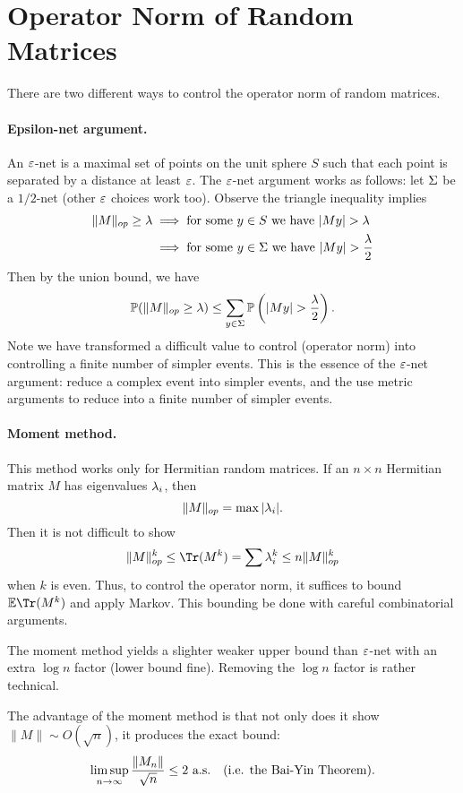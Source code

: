 \section*{Operator Norm of Random Matrices}

There are two different ways to control the operator norm of random matrices.

\paragraph{Epsilon-net argument.} An $\e$-net is a maximal set of points on the unit sphere $S$ such that each point is separated by a distance at least $\e$. The $\e$-net argument works as follows: let $\S$ be a $1/2$-net (other $\e$ choices work too). Observe the triangle inequality implies
\[
    \begin{split}
        \|M\|_{op} \ge \l & \implies \text{for some $y \in S$ we have } |My| > \l            \\
                          & \implies \text{for some $y \in \S$ we have } |My| > \frac{\l}{2} \\
    \end{split}
\]
Then by the union bound, we have
\[
    \bP(\|M\|_{op} \ge \l) \le \sum_{y \in \S} \bP\left(|My| > \frac{\l}{2}\right).
\]
Note we have transformed a difficult value to control (operator norm) into controlling a finite number of simpler events. This is the essence of the $\e$-net argument: reduce a complex event into simpler events, and the use metric arguments to reduce into a finite number of simpler events.

\paragraph{Moment method.} This method works only for Hermitian random matrices. If an $n \times n$ Hermitian matrix $M$ has eigenvalues $\l_i$, then
\[
    \|M\|_{op} = \max |\l_i|.
\]
Then it is not difficult to show
\[
    \|M\|^k_{op} \leq \Tr(M^k) = \sum \l_i^k \leq n\|M\|^k_{op}
\]
when $k$ is even. Thus, to control the operator norm, it suffices to bound $\bE \Tr(M^k)$ and apply Markov. This bounding be done with careful combinatorial arguments.

The moment method yields a slighter weaker upper bound than $\e$-net with an extra $\log n$ factor (lower bound fine). Removing the $\log n$ factor is rather technical.

The advantage of the moment method is that not only does it show $\|M\| \sim O(\sqrt{n})$, it produces the exact bound:
\[
    \limsup_{n \to \i} \frac{\|M_n\|}{\sqrt{n}} \le 2 \ \text{a.s.} \quad (\text{i.e. the Bai-Yin Theorem}).
\]


